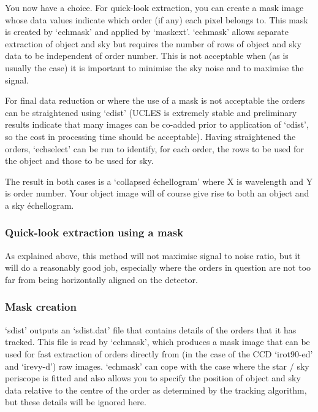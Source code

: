    You now have a choice. For quick-look extraction, you can create a
   mask image whose data values indicate which order (if any) each pixel
   belongs to. This mask is created by `echmask' and applied by
   `maskext'. `echmask' allows separate extraction of object and sky but
   requires the number of rows of object and sky data to be independent
   of order number. This is not acceptable when (as is usually the case)
   it is important to minimise the sky noise and to maximise the signal.

   For final data reduction or where the use of a mask is not acceptable
   the orders can be straightened using `cdist' (UCLES is extremely
   stable and preliminary results indicate that many images can be
   co-added prior to application of `cdist', so the cost in processing
   time should be acceptable). Having straightened the orders,
   `echselect' can be run to identify, for each order, the rows to be
   used for the object and those to be used for sky.

   The result in both cases is a `collapsed \'echellogram' where X is
   wavelength and Y is order number. Your object image will of course
   give rise to both an object and a sky \'echellogram.


\subsubsection{Quick-look extraction using a mask}

   As explained above, this method will not maximise signal to noise
   ratio, but it will do a reasonably good job, especially where the
   orders in question are not too far from being horizontally aligned on
   the detector.


\subsubsection{Mask creation}

   `sdist' outputs an `sdist.dat' file that contains details of the
   orders that it has tracked. This file is read by `echmask', which
   produces a mask image that can be used for fast extraction of orders
   directly from (in the case of the CCD `irot90-ed' and `irevy-d') raw
   images.  `echmask' can cope with the case where the star / sky
   periscope is fitted and also allows you to specify the position of
   object and sky data relative to the centre of the order as determined
   by the tracking algorithm, but these details will be ignored here.

